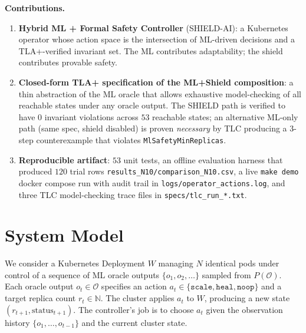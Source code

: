 \documentclass[conference,10pt]{IEEEtran}
\begin{document}
\textbf{Contributions.}
\begin{enumerate}
    \item \textbf{Hybrid ML + Formal Safety Controller}
          (SHIELD-AI): a Kubernetes operator whose action space is the
          intersection of ML-driven decisions and a TLA+-verified
          invariant set. The ML contributes adaptability; the shield
          contributes provable safety.
    \item \textbf{Closed-form TLA+ specification of the ML+Shield
          composition}: a thin abstraction of the ML oracle that
          allows exhaustive model-checking of all reachable states
          under any oracle output. The SHIELD path is verified to have
          $0$ invariant violations across $53$ reachable states;
          an alternative ML-only path (same spec, shield disabled) is
          proven \emph{necessary} by TLC producing a 3-step
          counterexample that violates \texttt{MlSafetyMinReplicas}.
    \item \textbf{Reproducible artifact}: $53$ unit tests, an offline
          evaluation harness that produced $120$ trial rows
          \texttt{results\_N10/comparison\_N10.csv}, a live
          \texttt{make demo} docker compose run with audit trail in
          \texttt{logs/operator\_actions.log}, and three
          TLC model-checking trace files in \texttt{specs/tlc\_run\_*.txt}.
\end{enumerate}

\section{System Model}
\label{sec:model}

We consider a Kubernetes Deployment $W$ managing $N$ identical pods
under control of a sequence of ML oracle outputs
$\{o_1, o_2, \ldots\}$ sampled from $P(\mathcal{O})$. Each oracle
output $o_t \in \mathcal{O}$ specifies an action $a_t \in
\{\texttt{scale}, \texttt{heal}, \texttt{noop}\}$ and a target
replica count $r_t \in \mathbb{N}$. The cluster applies $a_t$ to $W$,
producing a new state $(r_{t+1}, \text{status}_{t+1})$. The controller's
job is to choose $a_t$ given the observation history
$\{o_1, \ldots, o_{t-1}\}$ and the current cluster state.
\end{document}
